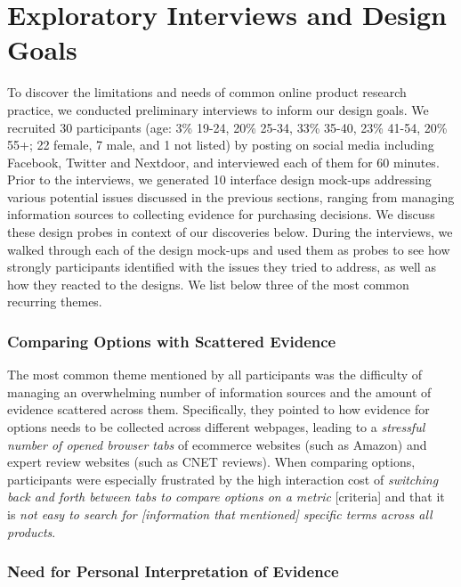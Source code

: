 \section{Exploratory Interviews and Design Goals}

To discover the limitations and needs of common online product research practice, we conducted preliminary interviews to inform our design goals. We recruited 30 participants (age: 3\% 19-24, 20\% 25-34, 33\% 35-40, 23\% 41-54, 20\% 55+; 22 female, 7 male, and 1 not listed) by posting on social media including Facebook, Twitter and Nextdoor, and interviewed each of them for 60 minutes.  Prior to the interviews, we generated 10 interface design mock-ups addressing various potential issues discussed in the previous sections, ranging from managing information sources to collecting evidence for purchasing decisions. We discuss these design probes in context of our discoveries below. During the interviews, we walked through each of the design mock-ups and used them as probes to see how strongly participants identified with the issues they tried to address, as well as how they reacted to the designs. We list below three of the most common recurring themes.

\subsubsection{Comparing Options with Scattered Evidence}

The most common theme mentioned by all participants was the difficulty of managing an overwhelming number of information sources and the amount of evidence scattered across them. Specifically, they pointed to how evidence for options needs to be collected across different webpages, leading to a \emph{stressful number of opened browser tabs} of ecommerce websites (such as Amazon) and expert review websites (such as CNET reviews). When comparing options, participants were especially frustrated by the high interaction cost of \emph{switching back and forth between tabs to compare options on a metric} [criteria] and that it is \emph{not easy to search for [information that mentioned] specific terms across all products}.

\subsubsection{Need for Personal Interpretation of Evidence}

